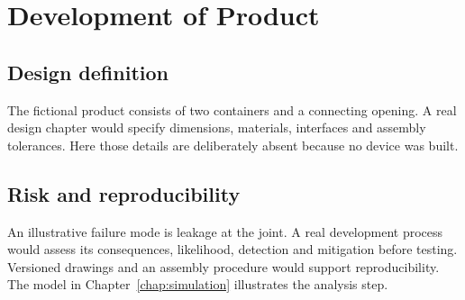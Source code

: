 \chapter{Development of Product}
\label{chap:development_of_product}

\section{Design definition}
\label{sec:design}
The fictional product consists of two containers and a connecting opening.
A real design chapter would specify dimensions, materials, interfaces and assembly
tolerances. Here those details are deliberately absent because no device was built.

\section{Risk and reproducibility}
An illustrative failure mode is leakage at the joint. A real development process
would assess its consequences, likelihood, detection and mitigation before testing.
Versioned drawings and an assembly procedure would support reproducibility.
The model in Chapter~\ref{chap:simulation} illustrates the analysis step.
